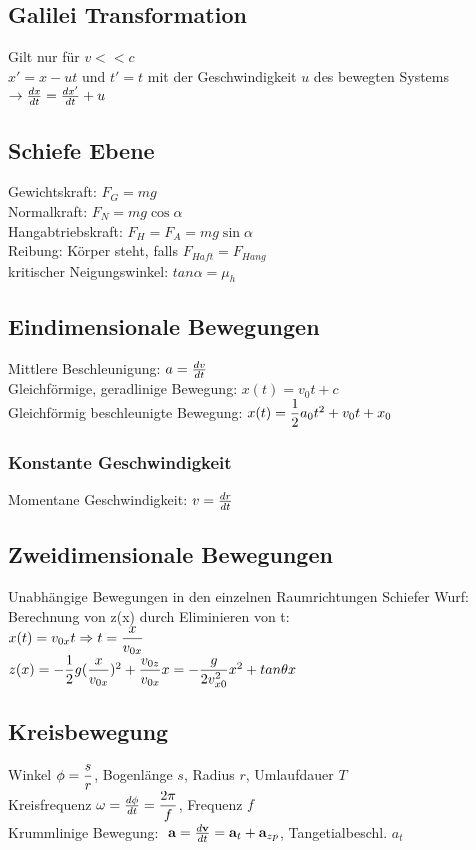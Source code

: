 \documentclass[fs, footer]{latex4ei}
\begin{document}
\begin{multicols*}{4}
\subsection{Galilei Transformation}
Gilt nur für $v<<c$\\
$x' = x - ut$ und $t' = t$ mit der Geschwindigkeit $u$ des bewegten Systems $\rightarrow \frac{dx}{dt} = \frac{dx'}{dt} + u$\\
\subsection{Schiefe Ebene}
Gewichtskraft: $F_G = mg$\\
Normalkraft: $F_N = mg\cos \alpha$\\
Hangabtriebskraft: $F_H = F_A = mg\sin \alpha$\\
Reibung: Körper steht, falls $F_{Haft} = F_{Hang}$\\
kritischer Neigungswinkel: $tan \alpha = \mu_h$\\

\subsection{Eindimensionale Bewegungen}
Mittlere Beschleunigung: $a = \frac{dv}{dt}$\\
Gleichförmige, geradlinige Bewegung: $x(t) = v_0t+c$\\
Gleichförmig beschleunigte Bewegung: $x(t) = \dfrac{1}{2}a_0t^2+v_0t+x_0$\\
\subsubsection{Konstante Geschwindigkeit}
Momentane Geschwindigkeit: $v = \frac{dr}{dt}$\\
\subsection{Zweidimensionale Bewegungen}
Unabhängige Bewegungen in den einzelnen Raumrichtungen
Schiefer Wurf:
Berechnung von z(x) durch Eliminieren von t: \\$x(t) = v_{0x}t \Rightarrow t = \dfrac{x}{v_{0x}}$\\
$z(x) = -\dfrac{1}{2}g(\dfrac{{x}}{v_{0x}})^2 + \dfrac{v_{0z}}{v_{0x}}x = -\dfrac{g}{2v^2_{x0}}x^2 + tan\theta x$\\
\subsection{Kreisbewegung}
Winkel $\phi = \dfrac{s}{r}$, 	Bogenlänge $s$, Radius $r$, Umlaufdauer $T$\\
Kreisfrequenz $\omega = \frac{d\phi}{dt} =\dfrac{2\pi}{f}$,	Frequenz $f$\\
Krummlinige Bewegung: $\ \textbf{a} = \frac{d\textbf{v}}{dt} = \textbf{a}_t + \textbf{a}_{zp}$,	Tangetialbeschl. $a_t$\\

\end{multicols*}
\end{document}

